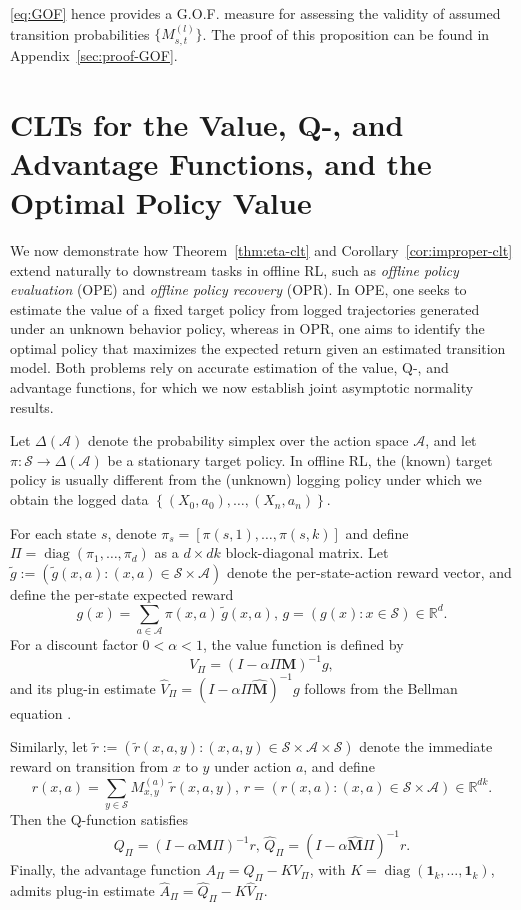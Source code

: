 \documentclass[twoside,11pt]{article}
\newcommand{\pow}[1]{^{(#1)}}%
\numberwithin{equation}{section}
\newcommand{\lb}{\left[}
\newcommand{\rb}{\right]}
\newcommand{\indexeddata}{\left\{(X_0,a_0),\dots,(X_n,a_n)\right\}}
\begin{document}
\cref{eq:GOF} hence provides a G.O.F. measure for assessing the validity of assumed transition probabilities $\{M_{s,t} \pow l\}$.
The proof of this proposition can be found in Appendix~\ref{sec:proof-GOF}.

\section{CLTs for the Value, Q-, and Advantage Functions, and the Optimal Policy Value}
\label{sec:RL}

We now demonstrate how Theorem~\ref{thm:eta-clt} and Corollary~\ref{cor:improper-clt} extend naturally to downstream tasks in offline RL, such as \emph{offline policy evaluation} (OPE) and \emph{offline policy recovery} (OPR).  
In OPE, one seeks to estimate the value of a fixed target policy from logged trajectories generated under an unknown behavior policy, whereas in OPR, one aims to identify the optimal policy that maximizes the expected return given an estimated transition model.  
Both problems rely on accurate estimation of the value, Q-, and advantage functions, for which we now establish joint asymptotic normality results.  

Let $\Delta(\mathcal{A})$ denote the probability simplex over the action space $\mathcal A$, and let $\pi: \mathcal{S} \to \Delta(\mathcal{A})$ be a stationary target policy.
In offline RL, the (known) target policy is usually different from the (unknown) logging policy under which we obtain the logged data $\indexeddata$.

For each state $s$, denote $\pi_s = \lb \pi(s,1), \ldots, \pi(s,k) \rb$ and define $\Pi = \operatorname{diag}(\pi_1, \ldots, \pi_d)$ as a $d\times dk$ block-diagonal matrix.
Let $\tilde g := (\tilde g(x,a):(x,a)\in\mathcal{S}\times\mathcal{A})$ denote the per-state-action reward vector, and define the per-state expected reward
\[
g(x) = \sum_{a\in\mathcal{A}} \pi(x,a)\,\tilde g(x,a), \,
g = (g(x):x\in\mathcal{S})\in\mathbb{R}^d.
\]
For a discount factor $0<\alpha<1$, the value function is defined by
\[
V_\Pi = (I-\alpha\Pi \mathbf{M})^{-1} g, 
\]
and its plug-in estimate
$\hat V_\Pi = (I-\alpha\Pi\hat{\mathbf{M}})^{-1} g$
follows from the Bellman equation \citep{bertsekas2011dynamic}.

Similarly, let $\tilde r := (\tilde r(x,a,y):(x,a,y)\in\mathcal{S}\times\mathcal{A}\times\mathcal{S})$ denote the immediate reward on transition from $x$ to $y$ under action $a$, and define
\[
r(x,a) = \sum_{y\in\mathcal{S}} M\pow a_{x,y}\,\tilde r(x,a,y), \,
r=(r(x,a):(x,a)\in\mathcal{S}\times\mathcal{A})\in\mathbb{R}^{dk}.
\]
Then the Q-function satisfies \citep{agarwal2019reinforcement}
\[
Q_\Pi = (I-\alpha \mathbf{M}\Pi)^{-1} r,
\,
\hat Q_\Pi = (I-\alpha \hat{\mathbf{M}}\Pi)^{-1} r.
\]
Finally, the advantage function $A_\Pi = Q_\Pi - K V_\Pi$, with $K = \operatorname{diag}(\mathbf{1}_k,\ldots,\mathbf{1}_k)$, admits plug-in estimate $\hat A_\Pi = \hat Q_\Pi - K \hat V_\Pi$.
\end{document}
